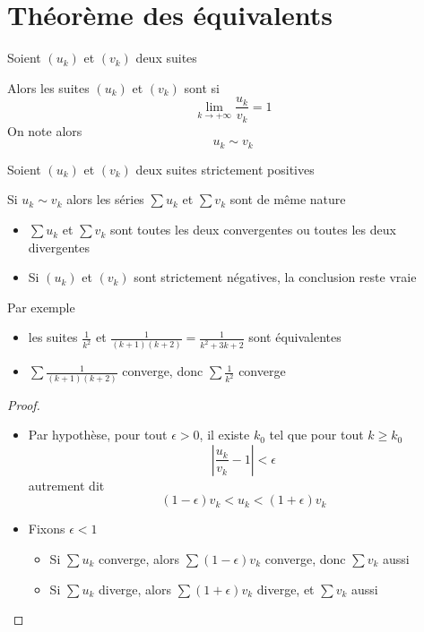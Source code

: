 \section{Théorème des équivalents}

\begin{frame}
Soient $(u_k)$ et $(v_k)$ deux suites  

\pause
Alors les suites $(u_k)$ et $(v_k)$ sont  si 
$$\lim_{k\to+\infty} \frac{u_k}{v_k}=1$$
\pause
On note alors $$u_k \sim v_k$$

\pause
\begin{theoreme}
Soient $(u_k)$ et $(v_k)$ deux suites strictement positives

\pause
Si $u_k \sim v_k$ alors les séries $\sum u_k$ et $\sum v_k$ sont de même nature
\end{theoreme}

\begin{itemize}
\item\pause $\sum u_k$ et $\sum v_k$ sont toutes les deux convergentes ou toutes les deux divergentes
\item\pause Si $(u_k)$ et $(v_k)$ sont strictement négatives, la conclusion reste vraie
\end{itemize}

\end{frame}

\begin{frame}
Par exemple
\begin{itemize}
\item\pause les suites $\frac{1}{k^2}$ et $\frac{1}{(k+1)(k+2)}=\frac{1}{k^2+3k+2}$
sont équivalentes
\item\pause $\sum \frac{1}{(k+1)(k+2)}$ converge, \pause donc $\sum \frac{1}{k^2}$ converge
\end{itemize}

\pause
\begin{proof}
\begin{itemize}
\item\pause Par hypothèse, pour tout $\epsilon>0$, il existe $k_0$ tel que pour
tout $k \ge k_0$
$$\left|\frac{u_k}{v_k} -1\right| < \epsilon$$
\pause
autrement dit 
$$(1-\epsilon)v_k < u_k <(1+\epsilon) v_k$$

\item\pause Fixons $\epsilon <1$
\begin{itemize}
\item\pause Si $\sum u_k$ converge, \pause alors $\sum(1-\epsilon) v_k$ converge, \pause donc $\sum v_k$ aussi
\smallskip
\item\pause Si $\sum u_k$ diverge, alors $\sum (1+\epsilon)v_k$ diverge, et $\sum v_k$ aussi 
\qedhere
\end{itemize}
\end{itemize}
\end{proof}
\end{frame}



